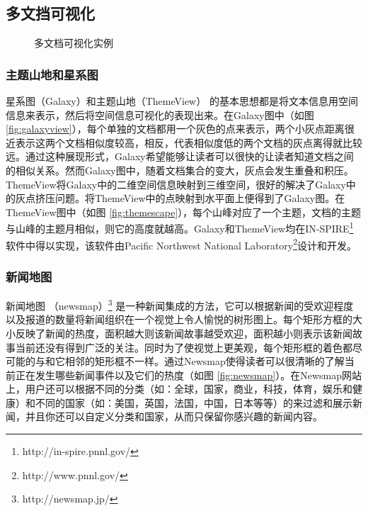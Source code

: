 \subsection{多文挡可视化}
\begin{figure}[htb]
    \centering
    \caption{多文档可视化实例}
    \label{fig:multi-doc-visual}
\end{figure}
\subsubsection{主题山地和星系图}
星系图（Galaxy）和主题山地（ThemeView）\cite{Wise1995} 的基本思想都是将文本信息用空间信息来表示，然后将空间信息可视化的表现出来。在Galaxy图中（如图 \ref{fig:galaxyview}），每个单独的文档都用一个灰色的点来表示，两个小灰点距离很近表示这两个文档相似度较高，相反，代表相似度低的两个文档的灰点离得就比较远。通过这种展现形式，Galaxy希望能够让读者可以很快的让读者知道文档之间的相似关系。然而Galaxy图中，随着文档集合的变大，灰点会发生重叠和积压。ThemeView将Galaxy中的二维空间信息映射到三维空间，很好的解决了Galaxy中的灰点挤压问题。将ThemeView中的点映射到水平面上便得到了Galaxy图。在ThemeView图中（如图 \ref{fig:themescape}），每个山峰对应了一个主题，文档的主题与山峰的主题月相似，则它的高度就越高。Galaxy和ThemeView均在IN-SPIRE\footnote{http://in-spire.pnnl.gov/}软件中得以实现，该软件由Pacific Northwest National Laboratory\footnote{http://www.pnnl.gov/}设计和开发。

\subsubsection{新闻地图}
新闻地图 （newsmap）\footnote{http://newsmap.jp/} 是一种新闻集成的方法，它可以根据新闻的受欢迎程度以及报道的数量将新闻组织在一个视觉上令人愉悦的树形图上。每个矩形方框的大小反映了新闻的热度，面积越大则该新闻故事越受欢迎，面积越小则表示该新闻故事当前还没有得到广泛的关注。同时为了使视觉上更美观，每个矩形框的着色都尽可能的与和它相邻的矩形框不一样。通过Newsmap使得读者可以很清晰的了解当前正在发生哪些新闻事件以及它们的热度（如图 \ref{fig:newsmap}）。在Newsmap网站上，用户还可以根据不同的分类（如：全球，国家，商业，科技，体育，娱乐和健康）和不同的国家（如：美国，英国，法国，中国，日本等等）的来过滤和展示新闻，并且你还可以自定义分类和国家，从而只保留你感兴趣的新闻内容。

